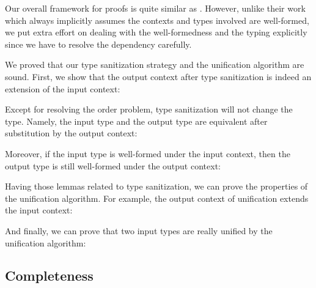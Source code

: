 Our overall framework for proofs is quite similar as
\citet{dunfield2013complete}. However, unlike their work which always implicitly assumes
the contexts and types involved are well-formed, we put extra effort on
dealing with the well-formedness and the typing explicitly since we
have to resolve the dependency carefully.

We proved that our type sanitization strategy and the unification algorithm
are sound.
First, we show that the output context after type
sanitization is indeed an extension of the input context:

\begin{lemma}[\TypeSanitizationExtensionName]
  \TypeSanitizationExtensionBody
\end{lemma}

Except for resolving the order problem, type sanitization will not change the
type. Namely, the input type and the output type are equivalent after
substitution by the output context:

\begin{lemma}[\TypeSanitizationEquivalenceName]
  \TypeSanitizationEquivalenceBody
\end{lemma}

Moreover, if the input type is well-formed under the input context, then the
output type is still well-formed under the output context:

\begin{lemma}[\TypeSanitizationWellFormednessName]
  \TypeSanitizationWellFormednessBody
\end{lemma}

Having those lemmas related to type sanitization, we can prove the properties of
the unification algorithm. For example, the output context of unification
extends the input context:

\begin{lemma}[\UnificationExtensionName]\leavevmode
  \UnificationExtensionBody
\end{lemma}

And finally, we can prove that two input types are really unified by the
unification algorithm:

\begin{lemma}[\UnificationEquivalenceName]\leavevmode
  \UnificationEquivalenceBody
\end{lemma}

\subsection{Completeness}

